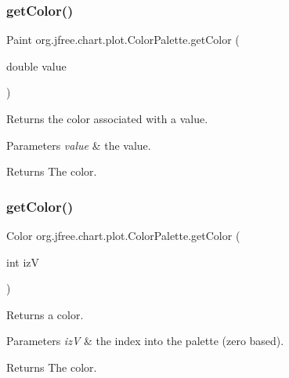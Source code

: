 \subsubsection{\texorpdfstring{get\+Color()}{getColor()}\hspace{0.1cm}{\footnotesize\ttfamily [1/2]}}
{\footnotesize\ttfamily Paint org.\+jfree.\+chart.\+plot.\+Color\+Palette.\+get\+Color (\begin{DoxyParamCaption}\item[{double}]{value }\end{DoxyParamCaption})}

Returns the color associated with a value.


\begin{DoxyParams}{Parameters}
{\em value} & the value.\\
\hline
\end{DoxyParams}
\begin{DoxyReturn}{Returns}
The color. 
\end{DoxyReturn}
\mbox{\label{classorg_1_1jfree_1_1chart_1_1plot_1_1_color_palette_ab4ad5bb21ee921ff3daa9b0ccc89a116}} 
\subsubsection{\texorpdfstring{get\+Color()}{getColor()}\hspace{0.1cm}{\footnotesize\ttfamily [2/2]}}
{\footnotesize\ttfamily Color org.\+jfree.\+chart.\+plot.\+Color\+Palette.\+get\+Color (\begin{DoxyParamCaption}\item[{int}]{izV }\end{DoxyParamCaption})}

Returns a color.


\begin{DoxyParams}{Parameters}
{\em izV} & the index into the palette (zero based).\\
\hline
\end{DoxyParams}
\begin{DoxyReturn}{Returns}
The color. 
\end{DoxyReturn}
\mbox{\label{classorg_1_1jfree_1_1chart_1_1plot_1_1_color_palette_a68be890282cd0bc87116003226285374}} 

